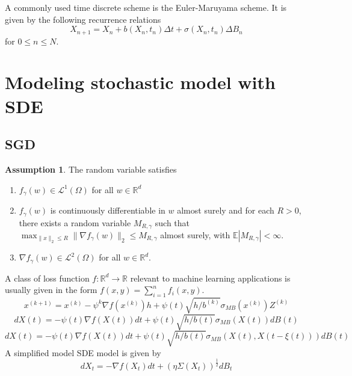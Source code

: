 \documentclass[12pt]{article}
\theoremstyle{definition}
\newtheorem{assumption}[theorem]{Assumption}
\numberwithin{equation}{section}
\newcommand{\norm}[1]{\lVert{#1}\rVert_2}
\begin{document}
A commonly used time discrete scheme is the Euler-Maruyama scheme. It is given by the following recurrence relations
\begin{equation}
  X_{n+1} = X_n + b(X_n, t_n)\Delta t + \sigma(X_n, t_n) \Delta B_n
\end{equation}
for $0 \leq n \leq N$.
\section{Modeling stochastic model with SDE}
\label{sec:sde_model}
\subsection{SGD}

\begin{assumption}
  The random variable satisfies 
  \begin{enumerate}
    \item $f_{\gamma}(w) \in \mathcal{L}^1(\Omega)$ for all $w \in \mathbb{R}^d$
    \item $f_{\gamma}(w)$ is continuously differentiable in $w$ almost surely and for each $R > 0$, there exists a random variable $M_{R,\gamma}$ such that $\max_{\norm{x} \leq R} \norm{ \nabla f_{\gamma}(w) } \leq M_{R,\gamma}$ almost surely, with $\mathbb{E} |M_{R,\gamma}| < \infty$.
    \item $\nabla f_{\gamma}(w) \in \mathcal{L}^2(\Omega)$ for all $w \in \mathbb{R}^d$.
  \end{enumerate}
\end{assumption}
A class of loss function $f : \mathbb{R}^d \rightarrow \mathbb{R}$ relevant to machine learning applications is usually given in the form $f(x,y) = \sum_{i=1}^n f_i(x,y)$.
\begin{equation}
  x^{(k+1)} = x^{(k)} - \psi^k \nabla f(x^{(k)}) h +  \psi(t)\sqrt{h/b^{(k)}} \sigma_{MB}(x^{(k)})Z^{(k)}
\end{equation}
\begin{equation}
  dX(t) = -\psi(t)\nabla f(X(t))dt + \psi(t)\sqrt{h/b(t)} \sigma_{MB}(X(t))dB(t)
\end{equation}
\begin{equation}
  dX(t) = -\psi(t)\nabla f(X(t))dt + \psi(t)\sqrt{h/b(t)} \sigma_{MB}(X(t), X(t-\xi(t)))dB(t)
\end{equation}
A simplified model SDE model is given by 
\begin{equation}
  dX_t = -\nabla f(X_t)dt + (\eta \Sigma(X_t))^{\frac{1}{2}}dB_t
\end{equation}
\end{document}
